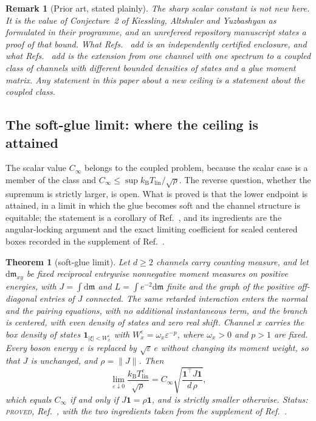 \documentclass[aps,10pt,superscriptaddress,floatfix,amsmath,amssymb,nofootinbib]{revtex4-2}
\newcommand{\kb}{k_{\mathrm B}}
\newcommand{\Tlin}{T_{\mathrm{lin}}}
\newcommand{\Cinf}{C_\infty}
\newcommand{\PROVED}{\textsc{proved}}
\newtheorem{theorem}{Theorem}
\newtheorem{remark}{Remark}
\begin{document}
\begin{remark}[Prior art, stated plainly]\label{rem:prior}
The sharp scalar constant is not new here. It is the value of Conjecture~2 of
Kiessling, Altshuler and Yuzbashyan \cite{kay} as formulated in their programme, and an
unrefereed repository manuscript \cite{kondratev} states a proof of that bound. What
Refs.~\cite{gamma,finiteband} add is an independently certified enclosure, and what
Refs.~\cite{optimum,finiteenergy,anisosharp} add is the extension from one channel with
one spectrum to a coupled class of channels with different bounded densities of states and
a glue moment matrix. Any statement in this paper about a \emph{new} ceiling is a statement
about the coupled class.
\end{remark}

\subsection{The soft-glue limit: where the ceiling is attained}\label{sec:soft}

The scalar value $\Cinf$ belongs to the coupled problem, because the scalar case is a member
of the class and $\Cinf\le\sup\kb\Tlin/\sqrt\rho$. The reverse question, whether the supremum
is strictly larger, is open. What is proved is that the lower endpoint is attained, in a
limit in which the glue becomes soft and the channel structure is equitable; the statement is
a corollary of Ref.~\cite{finiteenergy}, and its ingredients are the angular-locking argument
and the exact limiting coefficient for scaled centered boxes recorded in the supplement of
Ref.~\cite{univglue}.

\begin{theorem}[soft-glue limit]\label{thm:softlimit}
Let $d\ge2$ channels carry counting measure, and let $\mathrm{d}\mathfrak m_{xy}$ be fixed
reciprocal entrywise nonnegative moment measures on positive energies, with
$J=\int\mathrm{d}\mathfrak m$ and $L=\int e^{-2}\mathrm{d}\mathfrak m$ finite and the graph of the positive
off-diagonal entries of $J$ connected. The same retarded interaction enters the normal and
the pairing equations, with no additional instantaneous term, and the branch is centered,
with even density of states and zero real shift. Channel $x$ carries the box density of
states $\mathbf 1_{|\xi|<W_x^{\varepsilon}}$ with $W_x^{\varepsilon}=\omega_x\varepsilon^{-p}$,
where $\omega_x>0$ and $p>1$ are fixed. Every boson energy $e$ is replaced by
$\sqrt\varepsilon\,e$ without changing its moment weight, so that $J$ is unchanged, and
$\rho=\|J\|$. Then
\begin{equation}\label{eq:softlimit}
\lim_{\varepsilon\downarrow0}\frac{\kb\Tlin^{\varepsilon}}{\sqrt\rho}
=\Cinf\sqrt{\frac{\mathbf 1^{\!\top}J\mathbf 1}{d\,\rho}},
\end{equation}
which equals $\Cinf$ if and only if $J\mathbf 1=\rho\mathbf 1$, and is strictly smaller
otherwise.
Status: \PROVED{}, Ref.~\cite{finiteenergy}, with the two ingredients taken from the
supplement of Ref.~\cite{univglue}.
\end{theorem}
\end{document}
